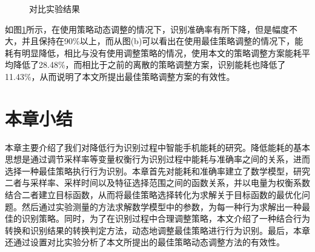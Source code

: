 \begin{figure}[!htb]
    \centering
    \caption{对比实验结果}\label{com_result}
\end{figure}

\par 如图\ref{com_result}所示，在使用策略动态调整的情况下，识别准确率有所下降，但是幅度不大，并且保持在90\%以上，而从图(b)可以看出在使用最佳策略调整的情况下，能耗有明显降低，相比与没有使用调整策略的情况，使用本文的策略调整方案能耗平均降低了28.48\%，而相比于之前的离散的策略调整方案，识别能耗也降低了11.43\%，从而说明了本文所提出最佳策略调整方案的有效性。

\section{本章小结}
\par 本章主要介绍了我们对降低行为识别过程中智能手机能耗的研究。降低能耗的基本思想是通过调节采样率等变量权衡行为识别过程中能耗与准确率之间的关系，进而选择一种最佳策略执行行为识别。本章首先对能耗和准确率建立了数学模型，研究二者与采样率、采样时间以及特征选择范围之间的函数关系，并以电量为权衡系数结合二者建立目标函数，从而将最佳策略选择转化为求解关于目标函数的最优化问题。然后通过实验测量的方法求解数学模型中的参数，为每一种行为求解出一种最佳的识别策略。同时，为了在识别过程中合理调整策略，本文介绍了一种结合行为转换和识别结果的转换判定方法，动态地调整最佳策略进行行为识别。最后，本章还通过设置对比实验分析了本文所提出的最佳策略动态调整方法的有效性。
